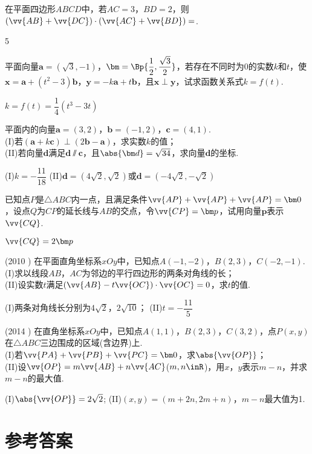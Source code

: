 \begin{exercise}
    在平面四边形$ABCD$中，若$AC=3$，$BD=2$，则$(\vv{AB}+\vv{DC})\cdot(\vv{AC}+\vv{BD})=$\tk.
    \begin{answer}
      5
    \end{answer}
  \item%
    平面向量$\bm a=(\sqrt{3},-1)$，$\bm=\Bp{\dfrac12,\dfrac{\sqrt3}2}$，若存在不同时为0的实数$k$和$t$，使$\bm x=\bm a+(t^2-3)\bm b$，$\bm y=-k\bm a+t\bm b$，且$\bm x\perp\bm y$，试求函数关系式$k=f(t)$.
    \begin{answer}
      $k=f(t)=\dfrac14(t^3-3t)$
    \end{answer}
  \vspace{2.5cm}
  \item%
    平面内的向量$\bm a=(3,2)$，$\bm b=(-1,2)$，$\bm c=(4,1)$.\\
    (I)若$(\bm a+k\bm c)\perp(2\bm b-\bm a)$，求实数$k$的值；\\
    (II)若向量$\bm d$满足$\bm d\varparallel\bm c$，且$\abs{\bm d}=\sqrt{34}$，求向量$\bm d$的坐标.
    \begin{answer}
      (I)$k=-\dfrac{11}{18}$
      (II)$\bm d=(4\sqrt2,\sqrt2)$或$\bm d=(-4\sqrt2,-\sqrt2)$
    \end{answer}
  \vspace{5cm}
  \item
    已知点$P$是$\triangle{ABC}$内一点，且满足条件$\vv{AP}+\vv{AP}+\vv{AP}=\bm 0$，设点$Q$为$CP$的延长线与$AB$的交点，令$\vv{CP}=\bm p$，试用向量$\bm p$表示$\vv{CQ}$.
    \begin{answer}
      $\vv{CQ}=2\bm p$
    \end{answer}
  \vspace{6cm}
  \item%
    (2010 )
    在平面直角坐标系$xOy$中，已知点$A(-1,-2)$，$B(2,3)$，$C(-2,-1)$.\\
    (I)求以线段$AB$，$AC$为邻边的平行四边形的两条对角线的长；\\
    (II)设实数$t$满足$(\vv{AB}-t\vv{OC})\cdot\vv{OC}=0$，求$t$的值.
    \begin{answer}
      (I)两条对角线长分别为$4\sqrt2$，$2\sqrt{10}$；
      (II)$t=-\dfrac{11}5$
    \end{answer}
  \item%
    (2014 )
    在直角坐标系$xOy$中，已知点$A(1,1)$，$B(2,3)$，$C(3,2)$，点$P(x,y)$在$\triangle{ABC}$三边围成的区域(含边界)上.\\
    (I)若$\vv{PA}+\vv{PB}+\vv{PC}=\bm 0$，求$\abs{\vv{OP}}$；\\
    (II)设$\vv{OP}=m\vv{AB}+n\vv{AC}$($m,n\inR$)，用$x$，$y$表示$m-n$，并求$m-n$的最大值.
    \begin{answer}
      (I)$\abs{\vv{OP}}=2\sqrt2$;
      (II)$(x,y)=(m+2n,2m+n)$，$m-n$最大值为1.
    \end{answer}
\end{exercise}
\stopexercise

\newpage
\section{参考答案}
\begin{multicols}{2}
  \printanswer
\end{multicols}
